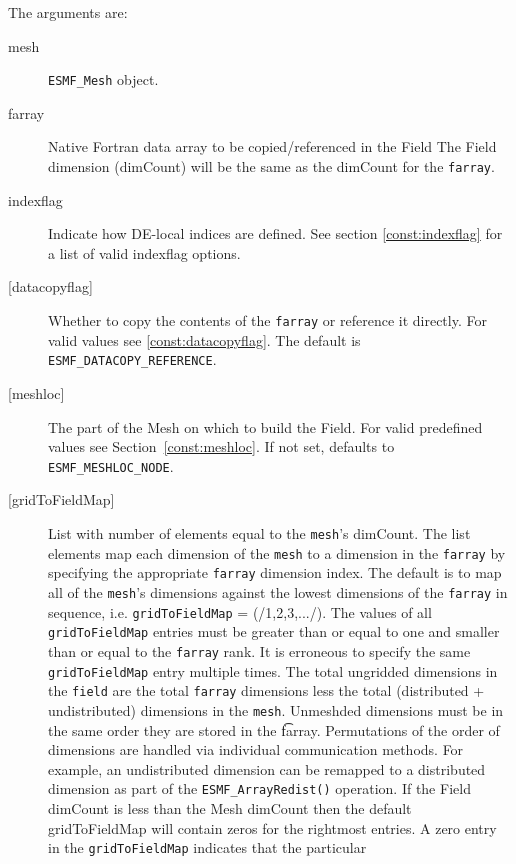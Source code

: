    The arguments are: 
   \begin{description} 
   \item [mesh] 
   {\tt ESMF\_Mesh} object. 
   \item [farray] 
   Native Fortran data array to be copied/referenced in the Field 
   The Field dimension (dimCount) will be the same as the dimCount 
   for the {\tt farray}. 
   \item[indexflag] 
   Indicate how DE-local indices are defined. See section 
   \ref{const:indexflag} for a list of valid indexflag options. 
   \item [{[datacopyflag]}] 
   Whether to copy the contents of the {\tt farray} or reference it directly. 
   For valid values see \ref{const:datacopyflag}. The default is 
   {\tt ESMF\_DATACOPY\_REFERENCE}. 
   \item [{[meshloc]}] 
   \begin{sloppypar} 
   The part of the Mesh on which to build the Field. For valid 
   predefined values see Section~\ref{const:meshloc}. 
   If not set, defaults to {\tt ESMF\_MESHLOC\_NODE}. 
   \end{sloppypar} 
   \item [{[gridToFieldMap]}] 
   List with number of elements equal to the 
   {\tt mesh}'s dimCount. The list elements map each dimension 
   of the {\tt mesh} to a dimension in the {\tt farray} by 
   specifying the appropriate {\tt farray} dimension index. The default is to 
   map all of the {\tt mesh}'s dimensions against the lowest dimensions of 
   the {\tt farray} in sequence, i.e. {\tt gridToFieldMap} = (/1,2,3,.../). 
   The values of all {\tt gridToFieldMap} entries must be greater than or equal 
   to one and smaller than or equal to the {\tt farray} rank. 
   It is erroneous to specify the same {\tt gridToFieldMap} entry 
   multiple times. The total ungridded dimensions in the {\tt field} 
   are the total {\tt farray} dimensions less 
   the total (distributed + undistributed) dimensions in 
   the {\tt mesh}. Unmeshded dimensions must be in the same order they are 
   stored in the {\t farray}. Permutations of the order of 
   dimensions are handled via individual communication methods. For example, 
   an undistributed dimension can be remapped to a distributed dimension 
   as part of the {\tt ESMF\_ArrayRedist()} operation. 
   If the Field dimCount is less than the Mesh dimCount then the default 
   gridToFieldMap will contain zeros for the rightmost entries. A zero 
   entry in the {\tt gridToFieldMap} indicates that the particular 

\end{description}
